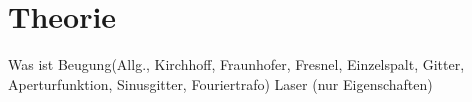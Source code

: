 \section{Theorie}
Was ist Beugung(Allg., Kirchhoff, Fraunhofer, Fresnel, Einzelspalt, Gitter, Aperturfunktion, Sinusgitter, Fouriertrafo)
Laser (nur Eigenschaften)